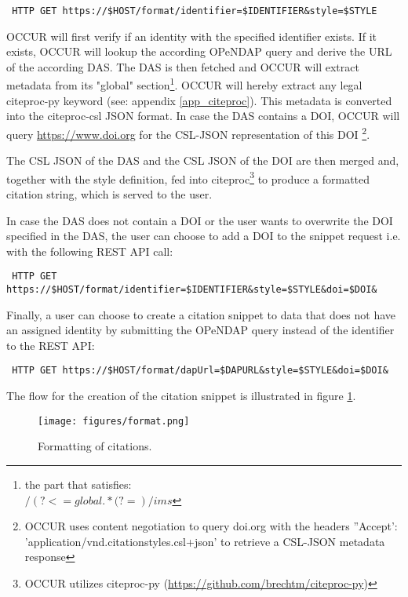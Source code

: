 \documentclass[letterpaper, twocolumn, parskip=half, fontsize=8pt, DIV=calc]{scrartcl}
\begin{document}
\begin{lstlisting}
 HTTP GET https://$HOST/format/identifier=$IDENTIFIER&style=$STYLE
\end{lstlisting}

OCCUR will first verify if an identity with the specified identifier exists. If it exists, \gls{OCCUR} will lookup the according OPeNDAP query and derive the URL of the according \gls{DAS}. The \gls{DAS} is then fetched and OCCUR will extract metadata from its "global" section\footnote{the part that satisfies: \\ $/(?<=global {.*(?=})/ims$}. OCCUR will hereby extract any legal citeproc-py keyword (see: appendix \ref{app_citeproc}). This metadata is converted into the citeproc-csl JSON format.
In case the \gls{DAS} contains a \gls{DOI}, OCCUR will query \url{https://www.doi.org} for the CSL-JSON representation of this \gls{DOI} \footnote{OCCUR uses content negotiation to query doi.org with the headers ''Accept': 'application/vnd.citationstyles.csl+json' to retrieve a CSL-JSON metadata response}. 

The CSL JSON of the DAS and the CSL JSON of the DOI are then merged and, together with the style definition, fed into citeproc\footnote{OCCUR utilizes citeproc-py (\url{https://github.com/brechtm/citeproc-py})} to produce a formatted citation string, which is served to the user.

In case the DAS does not contain a DOI or the user wants to overwrite the DOI specified in the DAS, the user can choose to add a DOI to the snippet request i.e. with the following REST API call:

\begin{lstlisting}
 HTTP GET https://$HOST/format/identifier=$IDENTIFIER&style=$STYLE&doi=$DOI&
\end{lstlisting}

Finally, a user can choose to create a citation snippet to data that does not have an assigned identity by submitting the OPeNDAP query instead of the identifier to the REST API:

\begin{lstlisting}
 HTTP GET https://$HOST/format/dapUrl=$DAPURL&style=$STYLE&doi=$DOI&
\end{lstlisting}

The flow for the creation of the citation snippet is illustrated in figure \ref{fig_format}.

\begin{figure}[ht]
 \texttt{[image: figures/format.png]}
 \caption{Formatting of citations.}
 \label{fig_format}
\end{figure}
\end{document}
